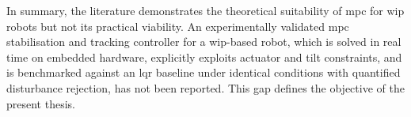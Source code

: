 In summary, the literature demonstrates the theoretical suitability of \ac{mpc} for \ac{wip} robots but not its practical viability. An experimentally validated \ac{mpc} stabilisation and tracking controller for a \ac{wip}-based robot, which is solved in real time on embedded hardware, explicitly exploits actuator and tilt constraints, and is benchmarked against an \ac{lqr} baseline under identical conditions with quantified disturbance rejection, has not been reported. This gap defines the objective of the present thesis.
